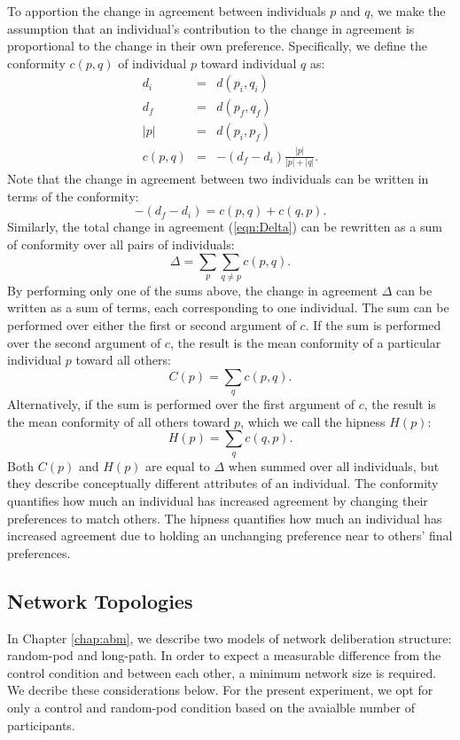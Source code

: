 To apportion the change in agreement between individuals $p$ and $q$,
we make the assumption that an individual's contribution to the change in agreement is proportional to the change in their own preference.
Specifically, we define the conformity $c(p,q)$ of individual $p$ toward individual $q$ as:
\begin{eqnarray}
    d_i &=& d(p_i, q_i) \\
    d_f &=& d(p_f, q_f) \\
    |p| &=& d(p_i, p_f) \\
    c(p,q) &=& -(d_f - d_i)\frac{|p|}{|p| + |q|}.
\end{eqnarray}
Note that the change in agreement between two individuals can be written in terms of the conformity:
\begin{equation}
    -(d_f - d_i) = c(p, q) + c(q, p).
\end{equation}
Similarly, the total change in agreement (\ref{eqn:Delta}) can be rewritten as a sum of conformity over all pairs of individuals:
\begin{equation}
    \Delta =
    \sum_p \sum_{q \neq p} c(p, q).
\end{equation}
By performing only one of the sums above, the change in agreement $\Delta$ can be written as a sum of terms, each corresponding to one individual.
The sum can be performed over either the first or second argument of $c$.
If the sum is performed over the second argument of $c$, the result is the mean conformity of a particular individual $p$ toward all others:
\begin{equation}
    C(p) = \sum_q c(p, q).
\end{equation}
Alternatively, if the sum is performed over the first argument of $c$, the result is the mean conformity of all others toward $p$, which we call the hipness $H(p)$:
\begin{equation}
    H(p) = \sum_q c(q, p).
\end{equation}
Both $C(p)$ and $H(p)$ are equal to $\Delta$ when summed over all individuals, but they describe conceptually different attributes of an individual.
The conformity quantifies how much an individual has increased agreement by changing their preferences to match others.
The hipness quantifies how much an individual has increased agreement due to holding an unchanging preference near to others' final preferences.


\subsection{Network Topologies}
In Chapter \ref{chap:abm}, we describe two models of network deliberation structure: random-pod and long-path.
In order to expect a measurable difference from the control condition and between each other, a minimum network size is required.
We decribe these considerations below.
For the present experiment, we opt for only a control and random-pod condition based on the avaialble number of participants.

